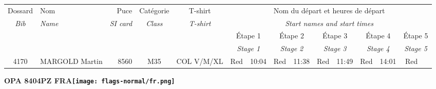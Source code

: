 \documentclass{report}
\begin{document}
  \begin{longtable}{|c|l|r|c|c|*{5}{cc|}}
    Dossard & Nom  & Puce    & Catégorie & T-shirt & \multicolumn{10}{c|}{Nom du départ et heures de départ} \\
    \itshape Bib     & \itshape Name & \itshape SI card & \itshape Class  & \itshape  T-shirt  & \multicolumn{10}{c|}{\itshape Start names and start times} \\
    \hline
    & & & & & \multicolumn{2}{c|}{Étape 1} & \multicolumn{2}{c|}{Étape 2} & \multicolumn{2}{c|}{Étape 3} & \multicolumn{2}{c|}{Étape 4} & \multicolumn{2}{c|}{Étape 5} \\
    & & & & & \multicolumn{2}{c|}{\itshape Stage 1} & \multicolumn{2}{c|}{\itshape Stage 2} & \multicolumn{2}{c|}{\itshape Stage 3} & \multicolumn{2}{c|}{\itshape Stage 4} & \multicolumn{2}{c|}{\itshape Stage 5} \\
    \hline
    4170 & MARGOLD Martin & 8560 & M35 & COL V/M/XL & Red & 10:04 & Red & 11:38 & Red & 11:49 & Red & 14:01 & Red &  \\
  \end{longtable}
\newpage
  \Huge \centering \bfseries OPA 8404PZ FRA\normalfont \footnotesize \sffamily \hfill \texttt{[image: flags-normal/fr.png]} \newline 
\end{document}
